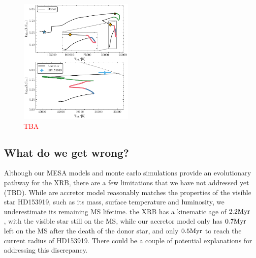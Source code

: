 \documentclass[linenumbers,trackchanges,twocolumn]{aastex701}
\newcommand{\red}{\textcolor{red}}
\begin{document}
\begin{figure}[htbp]
    \centering
    \includegraphics[width=0.5\textwidth]{xrb_fiducial_hr.pdf}
    \caption{\red{TBA}}
    \label{fig:xrb_fiducial_hr}
\end{figure}

\subsection{What do we get wrong?}

Although our MESA models and monte carlo simulations provide an evolutionary pathway for the XRB, there are a few limitations that we have not addressed yet (TBD). While are accretor model reasonably matches the properties of the visible star HD153919, such as its mass, surface temperature and luminosity, we underestimate its remaining MS lifetime. the XRB has a kinematic age of $2.2\rm Myr$, with the visible star still on the MS, while our accretor model only has $0.7\rm Myr$ left on the MS after the death of the donor star, and only $0.5\rm Myr$ to reach the current radius of HD153919. There could be a couple of potential explanations for addressing this discrepancy. 
\end{document}

